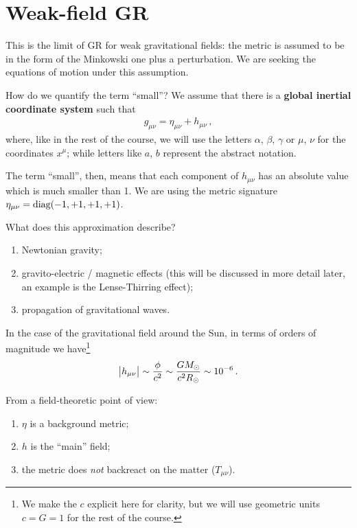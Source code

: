 \documentclass[main.tex]{subfiles}
\begin{document}
\section{Weak-field GR}


This is the limit of GR for weak gravitational fields: the metric is assumed to be in the form of the Minkowski one plus a perturbation.
We are seeking the equations of motion under this assumption. 

How do we quantify the term ``small''? 
We assume that there is a \textbf{global inertial coordinate system} such that 
%
\begin{align}
g_{\mu \nu } = \eta_{\mu \nu } + h_{\mu \nu }
\,,
\end{align}
%
where, like in the rest of the course, we will use the letters \(\alpha \), \(\beta \), \(\gamma \) or \(\mu \), \(\nu \) for the coordinates \(x^{\mu }\); while letters like \(a\), \(b\) represent the abstract notation. 

The term ``small'', then, means that each component of \(h_{\mu \nu }\) has an absolute value which is much smaller than 1.
We are using the metric signature \(\eta_{\mu \nu }= \text{diag}\qty(-1, +1, +1, +1)\). 

What does this approximation describe?
\begin{enumerate}
    \item Newtonian gravity;
    \item gravito-electric / magnetic effects (this will be discussed in more detail later, an example is the Lense-Thirring effect);
    \item propagation of gravitational waves.
\end{enumerate}

In the case of the gravitational field around the Sun, in terms of orders of magnitude we have\footnote{We make the \(c\) explicit here for clarity, but we will use geometric units \(c = G = 1\) for the rest of the course.}
%
\begin{align}
\abs{h_{\mu \nu }} \sim \frac{\phi }{c^2} \sim \frac{G M_{\odot}}{c^2 R_{\odot}} \sim \num{e-6}
\,.
\end{align}

From a field-theoretic point of view: 
\begin{enumerate}
    \item \(\eta \) is a background metric;
    \item \(h\) is the ``main'' field; 
    \item the metric does \emph{not} backreact on the matter (\(T_{\mu \nu }\)).
\end{enumerate}
\end{document}
